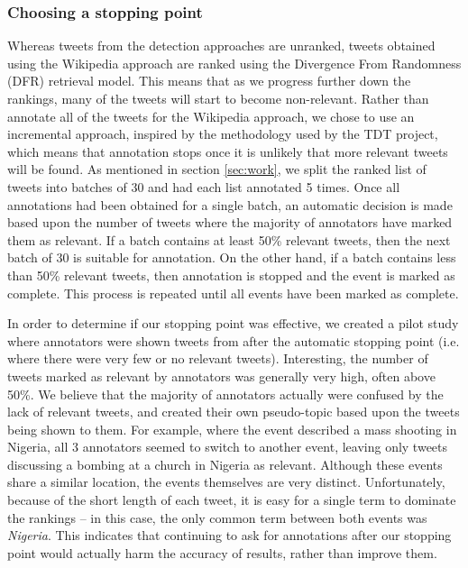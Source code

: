 \subsubsection{Choosing a stopping point}
Whereas tweets from the detection approaches are unranked, tweets obtained using the Wikipedia approach are ranked using the Divergence From Randomness (DFR) \citep{Amati02} retrieval model.
This means that as we progress further down the rankings, many of the tweets will start to become non-relevant.
Rather than annotate all of the tweets for the Wikipedia approach, we chose to use an incremental approach, inspired by the methodology used by the TDT project, which means that annotation stops once it is unlikely that more relevant tweets will be found.
As mentioned in section \ref{sec:work}, we split the ranked list of tweets into batches of 30 and had each list annotated 5 times.
Once all annotations had been obtained for a single batch, an automatic decision is made based upon the number of tweets where the majority of annotators have marked them as relevant.
If a batch contains at least 50\% relevant tweets, then the next batch of 30 is suitable for annotation.
On the other hand, if a batch contains less than 50\% relevant tweets, then annotation is stopped and the event is marked as complete.
This process is repeated until all events have been marked as complete.

In order to determine if our stopping point was effective, we created a pilot study where annotators were shown tweets from after the automatic stopping point (i.e. where there were very few or no relevant tweets).
Interesting, the number of tweets marked as relevant by annotators was generally very high, often above 50\%.
We believe that the majority of annotators actually were confused by the lack of relevant tweets, and created their own pseudo-topic based upon the tweets being shown to them.
For example, where the event described a mass shooting in Nigeria, all 3 annotators seemed to switch to another event, leaving only tweets discussing a bombing at a church in Nigeria as relevant.
Although these events share a similar location, the events themselves are very distinct.
Unfortunately, because of the short length of each tweet, it is easy for a single term to dominate the rankings -- in this case, the only common term between both events was \emph{Nigeria}.
This indicates that continuing to ask for annotations after our stopping point would actually harm the accuracy of results, rather than improve them.


